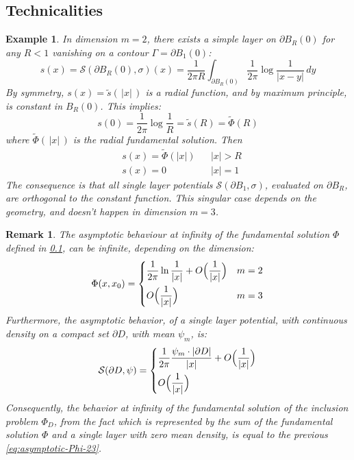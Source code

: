 \documentclass[10pt, a4paper, twoside, openright]{book}
\theoremstyle{definition}
\theoremstyle{plain}
\theoremstyle{plain}
\theoremstyle{plain}
\theoremstyle{plain}
\newtheorem{remark}[subsection]{Remark}
\theoremstyle{plain}
\theoremstyle{plain}
\newtheorem{example}[subsection]{Example}
\theoremstyle{plain}
\theoremstyle{plain}
\begin{document}
\subsection{Technicalities}
\begin{example}
 \label{example:van-s-lay}
 In dimension $m=2$, there exists a simple layer on $\partial B_R(0)$ for any $R<1$ vanishing on a contour $\Gamma = \partial B_1(0)$:
 \begin{equation}
 s(x) = \mathcal{S}(\partial B_R(0), \sigma)(x) = \frac{1}{2\pi R}\int_{\partial B_R(0)}\frac{1}{2\pi}\log\frac{1}{|x-y|}\,dy
 \end{equation}
 By symmetry, $s(x)=\tilde{s}(\,|x|\,)$ is a radial function, and by maximum principle, is constant in $B_R(0)$. This implies:
 \begin{equation}
  s(0) = \frac{1}{2\pi}\log\frac{1}{R}=\tilde{s}(R)=\tilde{\Phi}(R)
 \end{equation}
 where $\tilde{\Phi}(\,|x|\,)$ is the radial fundamental solution. Then
 \begin{align}
 & s(x) = \tilde{\Phi}(|x|) && |x| > R \\
 & s(x) = 0         && |x| = 1
 \end{align}
 The consequence is that all single layer potentials $\mathcal{S}(\partial B_1, \sigma)$, evaluated on $\partial B_R$, are orthogonal to the constant function. This singular case depends on the geometry, and doesn't happen in dimension $m=3$.
\end{example}
\begin{remark}
 The asymptotic behaviour at infinity of the fundamental solution $\Phi$ defined in \ref{}, can be infinite, depending on the dimension:
 \begin{equation}
 \label{eq:asymptotic-Phi-23}
  \Phi(x,x_0)=
  \left\{
  \begin{aligned}
   &\dfrac{1}{2\pi}\ln\dfrac{1}{|x|} + O\Bigl(\dfrac{1}{|x|}\Bigr) && m=2 \\
   &O\Bigl(\dfrac{1}{|x|}\Bigr) && m=3
  \end{aligned}
  \right.
\end{equation}
 Furthermore, the asymptotic behavior, of a single layer potential, with continuous density on a compact set $\partial D$, with mean $\psi_m$, is:
  \begin{equation}
 \label{eq:asymptotic-single}
  \mathcal{S}(\partial D,\psi)=
  \left\{
  \begin{aligned}
   &\dfrac{1}{2\pi}\dfrac{\psi_m\cdot|\partial D|}{|x|} + O\Bigl(\dfrac{1}{|x|}\Bigr) \\%
   &O\Bigl(\dfrac{1}{|x|}\Bigr) %
  \end{aligned}
  \right.
\end{equation}
Consequently, the behavior at infinity of the fundamental solution of the inclusion problem $\Phi_D$, from the fact which is represented by the sum of the fundamental solution $\Phi$ and a single layer with zero mean density, is equal to the previous \ref{eq:asymptotic-Phi-23}. 
\end{remark}
\end{document}
